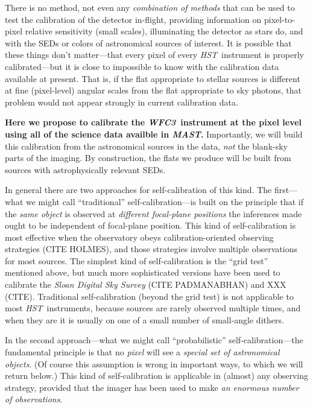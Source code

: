 \documentclass[12pt]{article}
\newcommand{\project}[1]{\textsl{#1}}
\newcommand{\HST}{\project{HST}}
\newcommand{\WFC}{\project{WFC3}}
\newcommand{\MAST}{\project{MAST}}
\begin{document}
There is no method, not even any \emph{combination of methods} that
can be used to test the calibration of the detector in-flight,
providing information on pixel-to-pixel relative sensitivity (small
scales), illuminating the detector as stars do, and with the SEDs or
colors of astronomical sources of interest.  It is possible that these
things don't matter---that every pixel of every \HST\ instrument is
properly calibrated---but it is close to impossible to know with the
calibration data available at present.  That is, if the flat
appropriate to stellar sources is different at fine (pixel-level)
angular scales from the flat appropriate to sky photons, that problem
would not appear strongly in current calibration data.

\textbf{Here we propose to calibrate the \WFC\ instrument at the pixel
  level using all of the science data availble in \MAST.}
Importantly, we will build this calibration from the astronomical
sources in the data, \emph{not} the blank-sky parts of the imaging.
By construction, the flats we produce will be built from sources with
astrophysically relevant SEDs.

In general there are two approaches for self-calibration of this kind.
The first---what we might call ``traditional'' self-calibration---is
built on the principle that if the \emph{same object} is observed at
\emph{different focal-plane positions} the inferences made ought to be
independent of focal-plane position.  This kind of self-calibration is
most effective when the observatory obeys calibration-oriented
observing strategies (CITE HOLMES), and those strategies involve
multiple observations for most sources.  The simplest kind of
self-calibration is the ``grid test'' mentioned above, but much more
sophisticated versions have been used to calibrate the \project{Sloan
  Digital Sky Survey} (CITE PADMANABHAN) and XXX (CITE).  Traditional
self-calibration (beyond the grid test) is not applicable to most
\HST\ instruments, because sources are rarely observed multiple times,
and when they are it is usually on one of a small number of
small-angle dithers.

In the second approach---what we might call ``probabilistic''
self-calibration---the fundamental principle is that no \emph{pixel}
will see a \emph{special set of astronomical objects}.  (Of course
this assumption is wrong in important ways, to which we will return
below.)  This kind of self-calibration is applicable in (almost) any
observing strategy, provided that the imager has been used to make
\emph{an enormous number of observations}.
\end{document}
